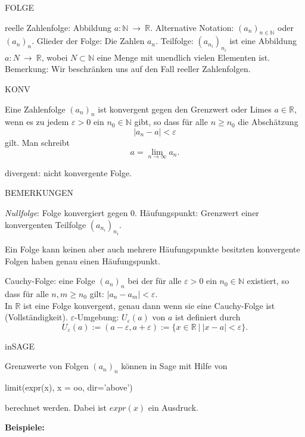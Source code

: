 \documentclass[fontsize=12pt,paper=a4,twoside,bibtotoc,idxtotoc,
liststotoc,pagesize,BCOR1.2cm,DIV15,chapterprefix,pagesize=pdftex]{scrbook}
\theoremstyle{plain}
\theoremstyle{definition}
\theoremstyle{remark}
\begin{document}
FOLGE


 {\color{red} reelle Zahlenfolge}: Abbildung $a:\mathbb{N} \ \rightarrow \ \mathbb{R}$.
 Alternative Notation: $(a_n)_{n \in \mathbb{N}}$ oder $(a_n)_{n}$.
 {\color{red} Glieder} der Folge: Die Zahlen $a_n$.
 {\color{red} Teilfolge}: $(a_{n_i})_{n_i}$ ist eine Abbildung $a:N \
\rightarrow \ \mathbb{R}$, wobei $N \subset \mathbb{N}$ eine Menge mit
unendlich vielen Elementen ist.
 Bemerkung: Wir beschränken uns auf den Fall reeller Zahlenfolgen. 


KONV

Eine Zahlenfolge $(a_n)_n$ ist {\color{red} konvergent} gegen den {\color{red}
Grenzwert} oder {\color{red} Limes} $a\in \mathbb{R}$, wenn es zu jedem
$\varepsilon >0$ ein $n_0 \in \mathbb{N}$ gibt, so dass für alle $n \geq
n_0$ die Abschätzung 
\[ |a_n - a|< \varepsilon \]
 gilt. Man schreibt
\[ a=\lim_{n \rightarrow \infty} a_n. \]

{\color{red} divergent}: nicht konvergente Folge. 

BEMERKUNGEN


 \emph{Nullfolge}: Folge konvergiert gegen $0$.
 {\color{red} Häufungspunkt}: Grenzwert einer konvergenten Teilfolge $(a_{n_i})_{n_i}$.

 Ein Folge kann keinen aber auch mehrere Häufungspunkte besitzten
 konvergente Folgen haben genau einen Häufungspunkt.

  {\color{red} Cauchy-Folge}: eine Folge $(a_n)_n$ bei der für
alle $\varepsilon>0$ ein $n_0 \in \mathbb{N}$ existiert, so dass für alle
$n,m \geq n_0$ gilt:
$|a_n - a_m| < \varepsilon$. \\
 In $\mathbb{R}$ ist eine Folge konvergent,
genau dann wenn sie eine Cauchy-Folge ist (Vollständigkeit).
 {\color{red} $\varepsilon$-Umgebung}: $U_\varepsilon(a)$ von $a$ ist
definiert durch
\[
U_\varepsilon(a) := (a-\varepsilon, a+\varepsilon) := \{ x \in \mathbb{R} \ | \ |x - a| < \varepsilon \}.
\] 


inSAGE

Grenzwerte von Folgen $(a_n)_n$ können in Sage mit Hilfe von 
\begin{sagein}
limit(expr(x), x = oo, dir='above')
\end{sagein}
berechnet werden. Dabei ist $expr(x)$ ein Ausdruck.

\textbf{Beispiele:}
\end{document}
